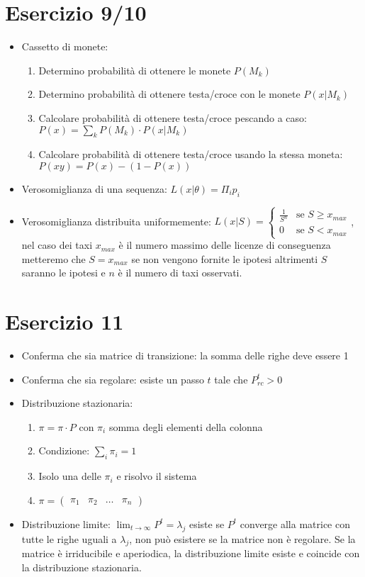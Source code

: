 \documentclass[12pt]{article}
\begin{document}
\section{Esercizio 9/10}
\begin{itemize}
    \item Cassetto di monete: \begin{enumerate}
        \item Determino probabilità di ottenere le monete $P(M_{k})$
        \item Determino probabilità di ottenere testa/croce con le monete $P(x|M_{k})$
        \item Calcolare probabilità di ottenere testa/croce pescando a caso: $P(x) = \sum_{k}P(M_{k})\cdot P(x|M_{k})$
        \item Calcolare probabilità di ottenere testa/croce usando la stessa moneta: $P(xy) = P(x)-(1-P(x))$
    \end{enumerate}
    \item Verosomiglianza di una sequenza: $L(x|\theta)=\Pi_{i}p_{i}$
    \item Verosomiglianza distribuita uniformemente: $L(x|S)=\begin{cases}
        \frac{1}{S^{n}} & \text{se } S \geq x_{max}\\
        0 & \text{se } S < x_{max}
    \end{cases}$, nel caso dei taxi $x_{max}$ è il numero massimo delle licenze di conseguenza metteremo che $S=x_{max}$ se non vengono fornite le ipotesi altrimenti $S$ saranno le ipotesi e $n$ è il numero di taxi osservati.
\end{itemize}
\section{Esercizio 11}
\begin{itemize}
    \item Conferma che sia matrice di transizione: la somma delle righe deve essere 1
    \item Conferma che sia regolare: esiste un passo $t$ tale che $P^{t}_{rc}>0$
    \item Distribuzione stazionaria:\begin{enumerate}
        \item $\pi = \pi\cdot P$ con $\pi_{i}$ somma degli elementi della colonna
        \item Condizione: $\sum_{i}\pi_{i}=1$
        \item Isolo una delle $\pi_{i}$ e risolvo il sistema
        \item $\pi = \begin{pmatrix}
            \pi_{1} & \pi_{2} & \ldots & \pi_{n}
        \end{pmatrix}$
    \end{enumerate} 
    \item Distribuzione limite: $\lim_{t\to\infty}P^{t} = \lambda_{j}$ esiste se $P^{t}$ converge alla matrice con tutte le righe uguali a $\lambda_{j}$, non può esistere se la matrice non è regolare. Se la matrice è irriducibile e aperiodica, la distribuzione limite esiste e coincide con la distribuzione stazionaria.
\end{itemize}
\end{document}
